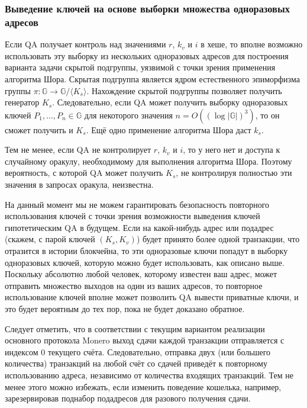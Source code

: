 \documentclass{mrl}
\begin{document}
\subsubsection{Выведение ключей на основе выборки множества одноразовых адресов}\label{sec:pairs-of-otks}

Если QA получает контроль над значениями $r$, $k_v$ и $i$ в хеше, то вполне возможно использовать эту выборку из нескольких одноразовых адресов для построения варианта задачи скрытой подгруппы, уязвимой с точки зрения применения алгоритма Шора. Скрытая подгруппа является ядром естественного эпиморфизма группы $\pi: \mathbb{G} \to \mathbb{G}/\langle K_s \rangle$. Нахождение скрытой подгруппы позволяет получить генератор $K_s$. Следовательно, если QA может получить выборку одноразовых ключей $P_1, \ldots, P_n \in \mathbb{G}$ для некоторого значения $n = O((\log\left|\mathbb{G}\right|)^3)$, то он сможет получить и $K_s$. Ещё одно применение алгоритма Шора даст $k_s$.

Тем не менее, если QA не контролирует $r$, $k_v$ и $i$, то у него нет и доступа к случайному оракулу, необходимому для выполнения алгоритма Шора. Поэтому вероятность, с которой QA может получить $K_s$, не контролируя полностью эти значения в запросах оракула, неизвестна.

На данный момент мы не можем гарантировать безопасность повторного использования ключей с точки зрения возможности выведения ключей гипотетическим QA в будущем. Если на какой-нибудь адрес или подадрес (скажем, с парой ключей $(K_s, K_v)$) будет принято более одной транзакции, что отразится в истории блокчейна, то эти одноразовые ключи попадут в выборку одноразовых ключей, которую можно будет использовать, как описано выше. Поскольку абсолютно любой человек, которому известен ваш адрес, может отправить множество выходов на один из ваших адресов, то повторное использование ключей вполне может позволить QA вывести приватные ключи, и это будет вероятным до тех пор, пока не будет доказано обратное.

Следует отметить, что в соответствии с текущим вариантом реализации основного протокола Monero выход сдачи каждой транзакции отправляется с индексом 0 текущего счёта. Следовательно, отправка двух (или большего количества) транзакций на любой счёт со сдачей приведёт к повторному использованию адреса, независимо от количества входящих транзакций. Тем не менее этого можно избежать, если изменить поведение кошелька, например, зарезервировав поднабор подадресов для разового получения сдачи.
\end{document}
